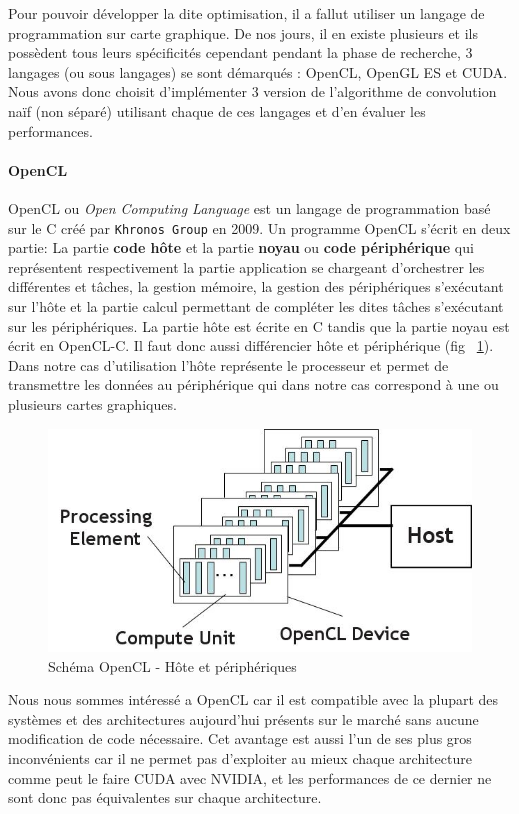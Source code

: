 Pour pouvoir développer la dite optimisation, il a fallut utiliser un langage de programmation sur carte graphique. De nos jours, il en existe plusieurs et ils possèdent tous leurs spécificités cependant pendant la phase de recherche, 3 langages (ou sous langages) se sont démarqués : OpenCL\cite{opencl}, OpenGL ES\cite{opengles} et CUDA\cite{cuda}. Nous avons donc choisit d'implémenter 3 version de l'algorithme de convolution naïf (non séparé) utilisant chaque de ces langages et d'en évaluer les performances.

\paragraph{OpenCL} OpenCL ou \emph{Open Computing Language} est un langage de programmation basé sur le C créé par \texttt{Khronos Group} en 2009.
Un programme OpenCL s'écrit en deux partie:
La partie \textbf{code hôte} et la partie \textbf{noyau} ou \textbf{code périphérique} qui représentent respectivement la partie application se chargeant d'orchestrer les différentes et tâches, la gestion mémoire, la gestion des périphériques s'exécutant sur l'hôte et la partie calcul permettant de compléter les dites tâches s'exécutant sur les périphériques. La partie hôte est écrite en C tandis que la partie noyau est écrit en OpenCL-C.
Il faut donc aussi différencier hôte et périphérique (fig ~\ref{fig:opencl}). Dans notre cas d'utilisation l'hôte représente le processeur et permet de transmettre les données au périphérique qui dans notre cas correspond à une ou plusieurs cartes graphiques.

\begin{figure}[H]
\centering
\includegraphics[width=0.5\linewidth]{images/opencl}
\caption{Schéma OpenCL - Hôte et périphériques\protect\footnotemark}
\label{fig:opencl}
\end{figure}


Nous nous sommes intéressé a OpenCL car il est compatible avec la plupart des systèmes et des architectures aujourd'hui présents sur le marché sans aucune modification de code nécessaire. Cet avantage est aussi l'un de ses plus gros inconvénients car il ne permet pas d'exploiter au mieux chaque architecture comme peut le faire CUDA avec NVIDIA, et les performances de ce dernier ne sont donc pas équivalentes sur chaque architecture. %

